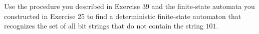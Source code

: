 \documentclass[../main.tex]{subfiles}
\begin{document}
Use the procedure you described in Exercise 39 and the finite-state automata you constructed in Exercise 25 to find a deterministic finite-state automaton that recognizes the set of all bit strings that do not contain the string $101$.

\solution
\end{document}
